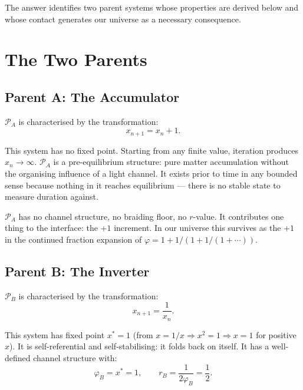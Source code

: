 \documentclass[prd,twocolumn,preprintnumbers,amsmath,amssymb]{revtex4-2}
\newcommand{\parentA}{\mathcal{P}_A}
\newcommand{\parentB}{\mathcal{P}_B}
\begin{document}
The answer identifies two parent systems whose properties are
derived below and whose contact generates our universe as a
necessary consequence.

\section{The Two Parents}

\subsection{Parent A: The Accumulator}

$\parentA$ is characterised by the transformation:
\begin{equation}
  x_{n+1} = x_n + 1.
\end{equation}

This system has no fixed point. Starting from any finite value,
iteration produces $x_n \to \infty$. $\parentA$ is a pre-equilibrium
structure: pure matter accumulation without the organising influence
of a light channel. It exists prior to time in any bounded sense
because nothing in it reaches equilibrium — there is no stable state
to measure duration against.

$\parentA$ has no channel structure, no braiding floor, no $r$-value.
It contributes one thing to the interface: the $+1$ increment.
In our universe this survives as the $+1$ in the continued fraction
expansion of $\varphi = 1 + 1/(1 + 1/(1 + \cdots))$.

\subsection{Parent B: The Inverter}

$\parentB$ is characterised by the transformation:
\begin{equation}
  x_{n+1} = \frac{1}{x_n}.
\end{equation}

This system has fixed point $x^* = 1$ (from $x = 1/x \Rightarrow
x^2 = 1 \Rightarrow x = 1$ for positive $x$). It is self-referential
and self-stabilising: it folds back on itself. It has a well-defined
channel structure with:
\begin{equation}
  \varphi_B = x^* = 1, \qquad r_B = \frac{1}{2\varphi_B} = \frac{1}{2}.
\end{equation}
\end{document}
